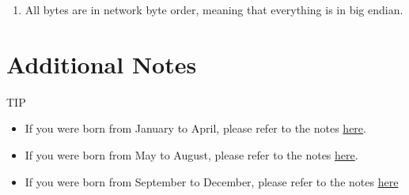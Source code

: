 {\begin{enumerate}
\begin{enumerate}[1.]
                        \end{enumerate}







                        \item All bytes are in network byte order, meaning that everything is in big endian.







                    \end{enumerate}















                \section*{Additional Notes}







                    TIP







                    \begin{itemize}







                        \item If you were born from January to April, please refer to the notes \href{https://github.com/brendonky18/Honors-Thesis.CTFs/blob/main/crypto-cracking/notes_0.md}{here}.







                        \item If you were born from May to August, please refer to the notes \href{https://github.com/brendonky18/Honors-Thesis.CTFs/blob/main/crypto-cracking/notes_1.md}{here}.







                        \item If you were born from September to December, please refer to the notes \href{https://github.com/brendonky18/Honors-Thesis.CTFs/blob/main/crypto-cracking/notes_1.md}{here}







                    \end{itemize}







            }
